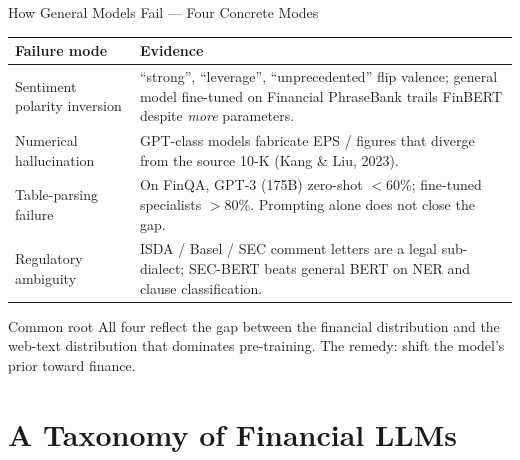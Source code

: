\documentclass[9pt,t]{beamer}
\begin{document}
\begin{frame}{How General Models Fail --- Four Concrete Modes}
\small
\begin{tabular}{p{}p{}}
\toprule
\textbf{Failure mode} & \textbf{Evidence} \\
\midrule
Sentiment polarity inversion &
  ``strong'', ``leverage'', ``unprecedented'' flip valence; general model fine-tuned
  on Financial PhraseBank trails FinBERT despite \emph{more} parameters. \\[3pt]
Numerical hallucination &
  GPT-class models fabricate EPS / figures that diverge from the source 10-K
  (Kang \& Liu, 2023). \\[3pt]
Table-parsing failure &
  On FinQA, GPT-3 (175B) zero-shot $<$60\%; fine-tuned specialists $>$80\%.
  Prompting alone does not close the gap. \\[3pt]
Regulatory ambiguity &
  ISDA / Basel / SEC comment letters are a legal sub-dialect; SEC-BERT beats
  general BERT on NER and clause classification. \\
\bottomrule
\end{tabular}

\medskip
\begin{alertblock}{Common root}
All four reflect the gap between the financial distribution and the web-text
distribution that dominates pre-training. The remedy: shift the model's prior
toward finance.
\end{alertblock}
\end{frame}

\section{A Taxonomy of Financial LLMs}
\end{document}
